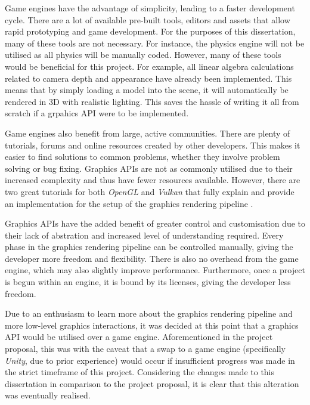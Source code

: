 \documentclass[12pt]{article}
\begin{document}
    Game engines have the advantage of simplicity, leading to a faster development cycle. There are a lot of available pre-built tools, editors and assets that allow rapid prototyping and game development. For the purposes of this dissertation, many of these tools are not necessary. For instance, the physics engine will not be utilised as all physics will be manually coded. However, many of these tools would be beneficial for this project. For example, all linear algebra calculations related to camera depth and appearance have already been implemented. This means that by simply loading a model into the scene, it will automatically be rendered in 3D with realistic lighting. This saves the hassle of writing it all from scratch if a grpahics API were to be implemented.

    Game engines also benefit from large, active communities. There are plenty of tutorials, forums and online resources created by other developers. This makes it easier to find solutions to common problems, whether they involve problem solving or bug fixing. Graphics APIs are not as commonly utilised due to their increased complexity and thus have fewer resources available. However, there are two great tutorials for both \textit{OpenGL} and \textit{Vulkan}\cite{vulkan} that fully explain and provide an implementation for the setup of the graphics rendering pipeline \cite{learnopengl}\cite{vulkantutorial}.

    Graphics APIs have the added benefit of greater control and customisation due to their lack of abstration and increased level of understanding required. Every phase in the graphics rendering pipeline can be controlled manually, giving the developer more freedom and flexibility. There is also no overhead from the game engine, which may also slightly improve performance. Furthermore, once a project is begun within an engine, it is bound by its licenses, giving the developer less freedom.

    Due to an enthusiasm to learn more about the graphics rendering pipeline and more low-level graphics interactions, it was decided at this point that a graphics API would be utilised over a game engine. Aforementioned in the project proposal, this was with the caveat that a swap to a game engine (specifically \textit{Unity}, due to prior experience) would occur if insufficient progress was made in the strict timeframe of this project. Considering the changes made to this dissertation in comparison to the project proposal, it is clear that this alteration was eventually realised.
\end{document}
